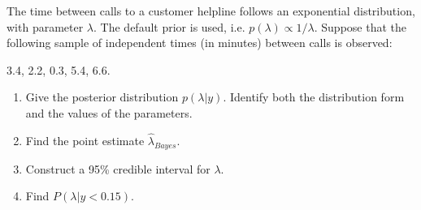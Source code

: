   \item The time between calls to a customer helpline follows an exponential distribution, with parameter $\lambda$. The default prior is used, i.e. $p(\lambda) \propto 1/ \lambda$.  Suppose that the following sample of independent times (in minutes) between calls is observed:
    
3.4, 2.2, 0.3, 5.4, 6.6. 
    
    \begin{enumerate}	 
      \item Give the posterior distribution  $p(\lambda | y)$. Identify both the distribution form and the values of the parameters. 
      \item Find the point estimate $\hat{\lambda}_{Bayes}$. 
      \item Construct a 95\% credible interval for $\lambda$. 
      \item Find $P(\lambda | y<0.15)$.
\end{enumerate}
     
